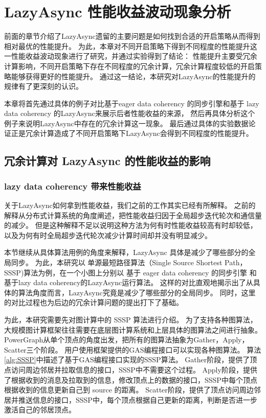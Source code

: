 

\chapter{LazyAsync 性能收益波动现象分析}
前面的章节介绍了LazyAsync遗留的主要问题是如何找到合适的开启策略从而得到相对最优的性能提升。
为此，本章对不同开启策略下得到不同程度的性能提升这一性能收益波动现象进行了研究，并通过实验得到了结论：
性能提升主要受冗余计算影响，不同开启策略下存在不同程度的冗余计算，冗余计算程度较低的开启策略能够获得更好的性能提升。
通过这一结论，本研究对LazyAsync的性能提升的规律有了更深刻的认识。

本章将首先通过具体的例子对比基于eager data coherency 的同步引擎和基于 lazy data coherency 的LazyAsync来展示后者性能收益的来源，
然后再具体分析这个例子来说明LazyAsync中存在的冗余计算这一现象。
最后通过具体的实验数据论证正是冗余计算造成了不同开启策略下LazyAsync会得到不同程度的性能提升。



\section{冗余计算对 LazyAsync 的性能收益的影响}
\subsection{lazy data coherency 带来性能收益}
关于LazyAsync如何拿到性能收益，我们之前的工作其实已经有所解释。
之前的解释从分布式计算系统的角度阐述，把性能收益归因于全局超步迭代轮次和通信量的减少。
但是这种解释不足以说明这种方法为何有时性能收益较高有时却较低，以及为何有时全局超步迭代轮次减少计算时间却并没有明显减少。


本节继续从具体算法用例的角度来解释，LazyAsync 具体是减少了哪些部分的全局同步。
为此，本研究以 单源最短路径算法（Single Source Shortest Path，SSSP)算法为例，在一个小图上分别以 基于 eager data coherency 的同步引擎
和 基于lazy data coherency的LazyAsync运行算法。
这样的对比直观地揭示出了从具体的算法角度而言，LazyAsync究竟是减少了哪些部分的全局同步。
同时，这里的对比过程也为后边的冗余计算问题的提出打下了基础。


为此，本研究需要先对图计算中的 SSSP 算法进行介绍。
为了支持各种图算法，大规模图计算框架往往需要在底层图计算系统和上层具体的图算法之间进行抽象。
PowerGraph从单个顶点的角度出发\cite{McCune@CS15}，把所有的图算法抽象为Gather，Apply，Scatter三个阶段。
用户使用框架提供的GAS编程接口可以实现各种图算法。
算法\ref{alg:SSSP}中描述了基于GAS编程接口实现的SSSP算法。
Gather阶段，提供了顶点访问周边邻居并拉取信息的接口，SSSP中不需要这个过程。
Apply阶段，提供了根据收到的消息及拉取到的信息，修改顶点上的数据的接口，SSSP中每个顶点根据收到的信息更新自己到 source 的距离。
Scatter阶段，提供了顶点访问周边邻居并推送信息的接口，SSSP中，每个顶点根据自己更新的距离，判断是否进一步激活自己的邻居顶点。

